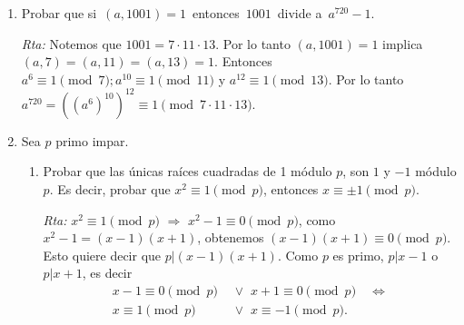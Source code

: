 \documentclass[a4paper,12pt,twoside,spanish,reqno]{amsbook}
\numberwithin{equation}{section}
\newcommand{\rta}{\noindent\textit{Rta: }}
\begin{document}
\begin{enumerate}
    
    
    
    
    
    
    \item Probar que si \,$(a,1001)=1$\, entonces \,$1001$\, divide a \,$a^{720}-1$.
    
    \rta Notemos que $1001=7\cdot11\cdot13$. Por lo tanto $(a, 1001) = 1$ implica $(a,7)=(a,11)=(a,13)=1$.
    Entonces $a^6\equiv1 \pmod{7}; a^{10}\equiv1 \pmod{11}$ y $ a^{12}\equiv1 \pmod{13}$.
    Por lo tanto $a^{720}=((a^6)^{10})^{12}\equiv 1 \pmod{7\cdot11\cdot13}$.
    
    \item Sea $p$ primo impar. 
\begin{enumerate}
    \item Probar que las únicas raíces cuadradas de 1 módulo $p$,  son $1$ y $-1$ módulo $p$. Es decir, probar que $x^2 \equiv 1 \pmod{p}$, entonces  $x \equiv \pm1 \pmod{p}$.
    
    \rta   $x^2 \equiv 1 \pmod{p}$ $\Rightarrow$  $x^2 - 1 \equiv 0 \pmod{p}$, como $x^2 -1 = (x-1)(x+1)$, obtenemos  $ (x-1)(x+1) \equiv 0 \pmod{p}$. Esto quiere decir  que $p|  (x-1)(x+1)$. Como $p$  es primo, $p | x -1$ o $p| x +1$, es decir 
    \begin{align*}
        x -1 \equiv 0 \pmod{p} \;\;&\vee \;\; x +1 \equiv 0 \pmod{p} \quad \Leftrightarrow  \\
        x  \equiv 1 \pmod{p} \;\;&\vee \;\; x  \equiv -1 \pmod{p}.
    \end{align*}


\end{enumerate}
\end{enumerate}
\end{document}
